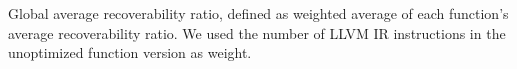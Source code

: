 \label{fig:CS-debug-ratio} Global average recoverability ratio, defined as weighted average of each function's average recoverability ratio. We used the number of LLVM IR instructions in the unoptimized function version as weight.